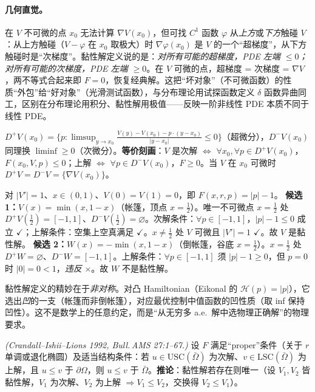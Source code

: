 \paragraph{几何直觉。}在 $V$ 不可微的点 $x_0$ 无法计算 $\nabla V(x_0)$，但可找 $C^1$ 函数 $\varphi$ 从\emph{上方}或\emph{下方}触碰 $V$：从上方触碰（$V-\varphi$ 在 $x_0$ 取极大）时 $\nabla\varphi(x_0)$ 是 $V$ 的一个“超梯度”，从下方触碰时是“次梯度”。黏性解定义说的是：\emph{对所有可能的超梯度，PDE 左端 $\le0$；对所有可能的次梯度，PDE 左端 $\ge0$}。在 $V$ 可微的点，超梯度 = 次梯度 = $\nabla V$，两不等式合起来即 $F=0$，恢复经典解。这把“坏对象”（不可微函数）的性质“外包”给“好对象”（光滑测试函数），与分布理论用试探函数定义 $\delta$ 函数异曲同工，区别在分布理论用积分、黏性解用极值——反映一阶非线性 PDE 本质不同于线性 PDE。

\begin{definition}[超微分与次微分]\label{def:dp-semijet}
$D^+V(x_0)=\{p:\limsup_{y\to x_0}\frac{V(y)-V(x_0)-p\cdot(y-x_0)}{|y-x_0|}\le0\}$（超微分），$D^-V(x_0)$ 同理换 $\liminf\ge0$（次微分）。\textbf{等价刻画}：$V$ 是次解 $\iff$ $\forall x_0,\forall p\in D^+V(x_0)$，$F(x_0,V,p)\le0$；上解 $\iff$ $\forall p\in D^-V(x_0)$，$F\ge0$。当 $V$ 在 $x_0$ 可微时 $D^+V=D^-V=\{\nabla V(x_0)\}$。
\end{definition}

\begin{example}\label{ex:dp-tent}
对 $|V'|=1$、$x\in(0,1)$、$V(0)=V(1)=0$，即 $F(x,r,p)=|p|-1$。
\textbf{候选 1：}$V(x)=\min(x,1-x)$（帐篷，顶点 $x=\tfrac12$）。唯一不可微点 $x=\tfrac12$ 处 $D^+V(\tfrac12)=[-1,1]$、$D^-V(\tfrac12)=\varnothing$。次解条件：$\forall p\in[-1,1]$，$|p|-1\le0$ 成立 $\checkmark$；上解条件：空集上空真满足 $\checkmark$。$x\ne\tfrac12$ 处 $V$ 可微且 $|V'|=1$ $\checkmark$。故 $V$ 是黏性解。
\textbf{候选 2：}$W(x)=-\min(x,1-x)$（倒帐篷，谷底 $x=\tfrac12$）。$x=\tfrac12$ 处 $D^+W=\varnothing$、$D^-W=[-1,1]$。上解条件：$\forall p\in[-1,1]$ 须 $|p|-1\ge0$，但 $p=0$ 时 $|0|=0<1$，\emph{违反} $\times$。故 $W$ 不是黏性解。
\end{example}

\begin{remark}[非对称性选出物理正确解]
黏性解定义的精妙在于\emph{非对称}。对凸 Hamiltonian（Eikonal 的 $\mathcal H(p)=|p|$），它选出\emph{凹}的一支（帐篷而非倒帐篷），对应最优控制中值函数的凹性质（取 inf 保持凹性）。这不是数学上的任意约定，而是“从无穷多 a.e.\ 解中选物理正确解”的物理要求。
\end{remark}

\begin{theorem}[比较原理与唯一性]\label{thm:dp-comparison}
\emph{(Crandall--Ishii--Lions 1992\cite{crandall1992users}, Bull.\,AMS 27:1--67.)} 设 $F$ 满足“proper”条件（关于 $r$ 单调或退化椭圆）及适当结构条件：若 $u\in\mathrm{USC}(\bar\Omega)$ 为次解、$v\in\mathrm{LSC}(\bar\Omega)$ 为上解，且 $u\le v$ 于 $\partial\Omega$，则 $u\le v$ 于 $\bar\Omega$。\textbf{推论}：黏性解若存在则唯一（设 $V_1,V_2$ 皆黏性解，$V_1$ 为次解、$V_2$ 为上解 $\Rightarrow V_1\le V_2$，交换得 $V_2\le V_1$）。
\end{theorem}

